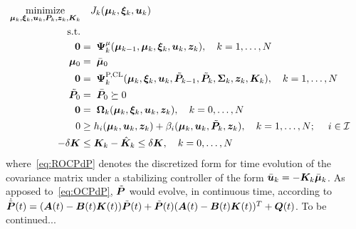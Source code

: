 \begin{alignat}{3}
\underset{\bmu_k,\bxi_k, \bu_k, \bP_k,\bz_k, \bK_k}{\text{minimize}}
    & \quad J_k(\bmu_k,\bxi_k, \bu_k) & & \label{eq:ROCPcost} \\
\text{s.t.}\notag\\
\bzero      & = \; \bPsimu_k(\bmu_{k-1},\bmu_k,\bxi_k, \bu_k,\bz_k),
\quad k = 1,\ldots, N \label{eq:ROCPdyn} \\
\bmu_0      & = \; \bar{\bmu}_0 \label{eq:ROCPdynIC} \\
\bzero      & = \; \bPsiPCL_k(\bmu_k,\bxi_k, \bu_k, \tbP_{k-1},\tbP_k,\bSi_k,\bz_k, \bK_k),
\quad k = 1,\ldots, N \label{eq:ROCPdP} \\
\tbP_0       & = \; \bar{\bP}_0 \succeq 0 \label{eq:ROCPdPIC} \\
\bzero      & = \; \bOm_k(\bmu_k,\bxi_k, \bu_k,\bz_k), \quad k = 0,\ldots, N \label{eq:ROCPpath} \\
0    & \geq  h_i(\bmu_k, \bu_k, \bz_k) + \be_i(\bmu_k, \bu_k, \tbP_k, \bz_k), \quad k = 1,\ldots, N;\; \quad i \in \calI \label{eq:ROCPconstraints}\\
-\de \bK   & \leq \bK_k - \hbK_k \leq  \de \bK \label{eq:ROCPdeltaK}, \quad k = 0,\ldots, N
\end{alignat} 
where~\eqref{eq:ROCPdP} denotes the discretized form for time evolution of the covariance matrix under a stabilizing controller of the form $\bar{\boldsymbol{u}}_k=-\boldsymbol{K}_k \bar{\boldsymbol{\mu}}_k$. As apposed to~\eqref{eq:OCPdP}, $\tilde{\boldsymbol{P}}$ would evolve, in continuous time, according to $\dot{\tilde{\boldsymbol{P}}}(t) = (\boldsymbol{A}(t)-\boldsymbol{B}(t) \boldsymbol{K}(t)) \tilde{\boldsymbol{P}}(t) + \tilde{\boldsymbol{P}}(t) (\boldsymbol{A}(t)-\boldsymbol{B}(t) \boldsymbol{K}(t))^T + \boldsymbol{Q}(t)$. To be continued...
